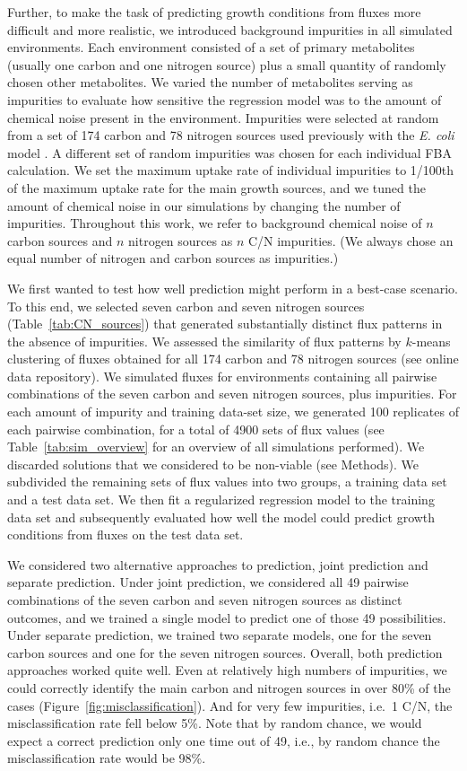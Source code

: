 \documentclass[12pt]{article}
\begin{document}
Further, to make the task of predicting growth conditions from fluxes more difficult and more realistic, we introduced background impurities in all simulated environments. Each environment consisted of a set of primary metabolites (usually one carbon and one nitrogen source) plus a small quantity of randomly chosen other metabolites. We varied the number of metabolites serving as impurities to evaluate how sensitive the regression model was to the amount of chemical noise present in the environment. Impurities were selected at random from a set of 174 carbon and 78 nitrogen sources used previously with the \emph{E. coli} model \cite{Feistetal2007}. A different set of random impurities was chosen for each individual FBA calculation. We set the maximum uptake rate of individual impurities to 1/100th of the maximum uptake rate for the main growth sources, and we tuned the amount of chemical noise in our simulations by changing the number of impurities. Throughout this work, we refer to background chemical noise of $n$ carbon sources and $n$ nitrogen sources as $n$ C/N impurities. (We always chose an equal number of nitrogen and carbon sources as impurities.)

We first wanted to test how well prediction might perform in a best-case scenario. To this end, we selected seven carbon and seven nitrogen sources (Table~\ref{tab:CN_sources}) that generated substantially distinct flux patterns in the absence of impurities. We assessed the similarity of flux patterns by $k$-means clustering of fluxes obtained for all 174 carbon and 78 nitrogen sources (see online data repository). We simulated fluxes for environments containing all pairwise combinations of the seven carbon and seven nitrogen sources, plus impurities. For each amount of impurity and training data-set size, we generated 100 replicates of each pairwise combination, for a total of 4900 sets of flux values (see Table~\ref{tab:sim_overview} for an overview of all simulations performed). We discarded solutions that we considered to be non-viable (see Methods). We subdivided the remaining sets of flux values into two groups, a training data set and a test data set. We then fit a regularized regression model to the training data set and subsequently evaluated how well the model could predict growth conditions from fluxes on the test data set.

We considered two alternative approaches to prediction, joint prediction and separate prediction. Under joint prediction, we considered all 49 pairwise combinations of the seven carbon and seven nitrogen sources as distinct outcomes, and we trained a single model to predict one of those 49 possibilities. Under separate prediction, we trained two separate models, one for the seven carbon sources and one for the seven nitrogen sources. Overall, both prediction approaches worked quite well.  Even at relatively high numbers of impurities, we could correctly identify the main carbon and nitrogen sources in over 80\% of the cases (Figure~\ref{fig:misclassification}).  And for very few impurities, i.e.\ 1 C/N, the misclassification rate fell below 5\%. Note that by random chance, we would expect a correct prediction only one time out of 49, i.e., by random chance the misclassification rate would be 98\%.
\end{document}
